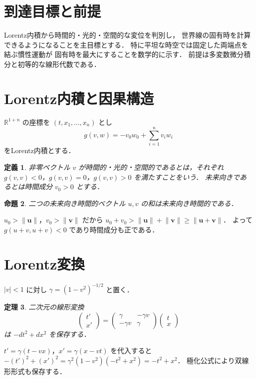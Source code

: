 \documentclass[a5paper,10pt,onecolumn]{jsarticle}
\makeatletter
\theoremstyle{mathnotetheorem}
\newtheorem{theorem}{定理}[section]
\newtheorem{definition}[theorem]{定義}
\newtheorem{proposition}[theorem]{命題}
\renewcommand{\proofname}{証明}
\renewenvironment{proof}[1][\proofname]{%
  \par\pushQED{\qed}\normalfont\topsep4\p@\@plus2\p@\relax
  \trivlist\item[\hskip\labelsep\bfseries #1]\ignorespaces
}{\popQED\endtrivlist\@endpefalse}
\newcommand{\norm}[1]{\lVert #1\rVert}
\makeatother
\begin{document}
\section*{到達目標と前提}
Lorentz内積から時間的・光的・空間的な変位を判別し，
世界線の固有時を計算できるようになることを主目標とする．
特に平坦な時空では固定した両端点を結ぶ慣性運動が
固有時を最大にすることを数学的に示す．
前提は多変数微分積分と初等的な線形代数である．

\section{Lorentz内積と因果構造}
$\mathbb R^{1+n}$ の座標を $(t,x_1,\ldots,x_n)$ とし
\[
 g(v,w)=-v_0w_0+\sum_{i=1}^nv_iw_i
\]
をLorentz内積とする．
\begin{definition}
非零ベクトル $v$ が時間的・光的・空間的であるとは，それぞれ
$g(v,v)<0$，$g(v,v)=0$，$g(v,v)>0$ を満たすことをいう．
未来向きであるとは時間成分 $v_0>0$ とする．
\end{definition}
\begin{proposition}
二つの未来向き時間的ベクトル $u,v$ の和は未来向き時間的である．
\end{proposition}
\begin{proof}
$u_0>\norm{\mathbf u}$，$v_0>\norm{\mathbf v}$ だから
$u_0+v_0>\norm{\mathbf u}+\norm{\mathbf v}\ge\norm{\mathbf u+\mathbf v}$．
よって $g(u+v,u+v)<0$ であり時間成分も正である．
\end{proof}
\section{Lorentz変換}
$|v|<1$ に対し $\gamma=(1-v^2)^{-1/2}$ と置く．
\begin{theorem}
二次元の線形変換
\[
 \begin{pmatrix}t'\\x'\end{pmatrix}
 =\begin{pmatrix}\gamma&-\gamma v\\-\gamma v&\gamma\end{pmatrix}
 \begin{pmatrix}t\\x\end{pmatrix}
\]
は $-dt^2+dx^2$ を保存する．
\end{theorem}
\begin{proof}
$t'=\gamma(t-vx)$，$x'=\gamma(x-vt)$ を代入すると
$-(t')^2+(x')^2=\gamma^2(1-v^2)(-t^2+x^2)=-t^2+x^2$．
極化公式により双線形形式も保存する．
\end{proof}
\end{document}

